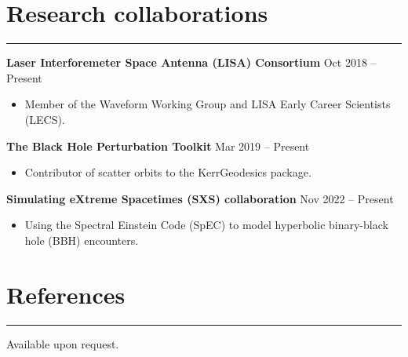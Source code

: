 \documentclass[10.5pt, oneside]{article}   	%
\begin{document}

{\color{Sectioncolour}
\section*{Research collaborations}
\vspace{-3mm}
\noindent\rule{\linewidth}{0.6pt}}
{\bf Laser Interforemeter Space Antenna (LISA) Consortium}  \hfill Oct 2018 -- Present \\
\vspace{-5mm}
\begin{itemize}
\item Member of the Waveform Working Group and LISA Early Career Scientists (LECS).
\end{itemize} 
{\bf The Black Hole Perturbation Toolkit}  \hfill Mar 2019 -- Present \\
\vspace{-5mm}
\begin{itemize}
\item Contributor of scatter orbits to the KerrGeodesics package. \href{https://bhptoolkit.org/KerrGeodesics/}{}
\end{itemize}
{\bf Simulating eXtreme Spacetimes (SXS) collaboration}  \hfill Nov 2022 -- Present \\
\vspace{-5mm}
\begin{itemize}
\item Using the Spectral Einstein Code (SpEC) to model hyperbolic binary-black hole (BBH) encounters.
\end{itemize} 

{\color{Sectioncolour}
\section*{References}
\vspace{-3mm}
\noindent\rule{\linewidth}{0.6pt}}
Available upon request.
\end{document}
